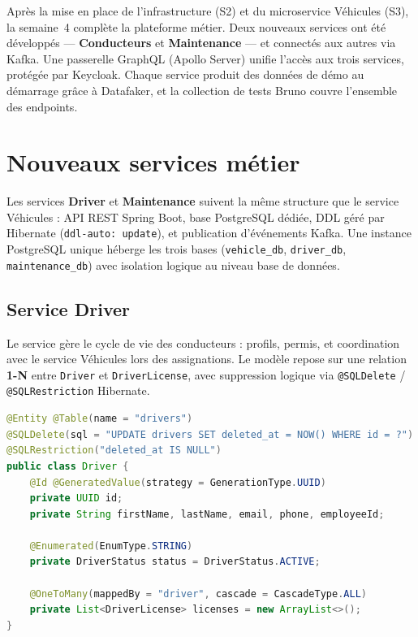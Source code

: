 \documentclass[12pt,a4paper]{article}
\begin{document}
Apr\`{e}s la mise en place de l'infrastructure (S2) et du microservice V\'{e}hicules (S3), la semaine~4 compl\`{e}te la plateforme m\'{e}tier. Deux nouveaux services ont \'{e}t\'{e} d\'{e}velopp\'{e}s --- \textbf{Conducteurs} et \textbf{Maintenance} --- et connect\'{e}s aux autres via Kafka. Une passerelle GraphQL (Apollo Server) unifie l'acc\`{e}s aux trois services, prot\'{e}g\'{e}e par Keycloak. Chaque service produit des donn\'{e}es de d\'{e}mo au d\'{e}marrage gr\^{a}ce \`{a} Datafaker, et la collection de tests Bruno couvre l'ensemble des endpoints.

\newpage
\section{Nouveaux services m\'{e}tier}

Les services \textbf{Driver} et \textbf{Maintenance} suivent la m\^{e}me structure que le service V\'{e}hicules : API REST Spring Boot, base PostgreSQL d\'{e}di\'{e}e, DDL g\'{e}r\'{e} par Hibernate (\texttt{ddl-auto: update}), et publication d'\'{e}v\'{e}nements Kafka. Une instance PostgreSQL unique h\'{e}berge les trois bases (\texttt{vehicle\_db}, \texttt{driver\_db}, \texttt{maintenance\_db}) avec isolation logique au niveau base de donn\'{e}es.

\subsection{Service Driver}

Le service g\`{e}re le cycle de vie des conducteurs : profils, permis, et coordination avec le service V\'{e}hicules lors des assignations. Le mod\`{e}le repose sur une relation \textbf{1-N} entre \texttt{Driver} et \texttt{DriverLicense}, avec suppression logique via \texttt{@SQLDelete} / \texttt{@SQLRestriction} Hibernate.

\begin{lstlisting}[language=Java, caption=Entit\'{e} Driver (extraits)]
@Entity @Table(name = "drivers")
@SQLDelete(sql = "UPDATE drivers SET deleted_at = NOW() WHERE id = ?")
@SQLRestriction("deleted_at IS NULL")
public class Driver {
    @Id @GeneratedValue(strategy = GenerationType.UUID)
    private UUID id;
    private String firstName, lastName, email, phone, employeeId;

    @Enumerated(EnumType.STRING)
    private DriverStatus status = DriverStatus.ACTIVE;

    @OneToMany(mappedBy = "driver", cascade = CascadeType.ALL)
    private List<DriverLicense> licenses = new ArrayList<>();
}
\end{lstlisting}
\end{document}
